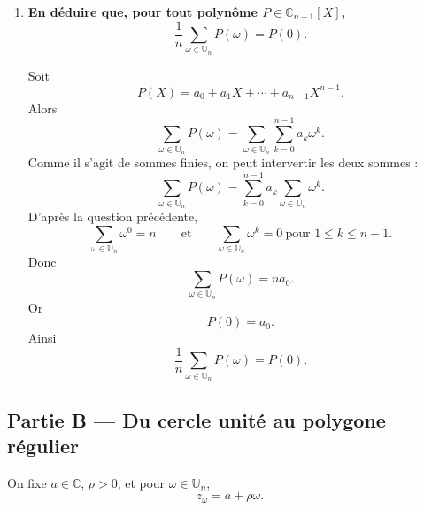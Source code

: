 \documentclass[11pt,a4paper]{article}
\newcommand{\C}{\mathbb{C}}
\newcommand{\U}{\mathbb{U}}
\newcommand{\ii}{\mathrm{i}}
\newcommand{\e}{\mathrm{e}}
\begin{document}
\begin{enumerate}[label=\textbf{A.\arabic*.}]
    Or
    \[
    q_m=1
    \Longleftrightarrow
    \e^{2m\ii\pi/n}=1
    \Longleftrightarrow
    n\mid m.
    \]

    Ainsi
    \[
    \boxed{
    S_m=
    \begin{cases}
    n & \text{si } n\mid m,\\
    0 & \text{sinon.}
    \end{cases}}
    \]

    \item \textbf{En déduire que, pour tout polynôme \(P\in\C_{n-1}[X]\),
    \[
    \frac1n\sum_{\omega\in\U_n}P(\omega)=P(0).
    \]}

    Soit
    \[
    P(X)=a_0+a_1X+\cdots+a_{n-1}X^{n-1}.
    \]
    Alors
    \[
    \sum_{\omega\in\U_n}P(\omega)
    =\sum_{\omega\in\U_n}\sum_{k=0}^{n-1}a_k\omega^k.
    \]
    Comme il s’agit de sommes finies, on peut intervertir les deux sommes :
    \[
    \sum_{\omega\in\U_n}P(\omega)
    =\sum_{k=0}^{n-1}a_k\sum_{\omega\in\U_n}\omega^k.
    \]
    D’après la question précédente,
    \[
    \sum_{\omega\in\U_n}\omega^0=n
    \qquad\text{et}\qquad
    \sum_{\omega\in\U_n}\omega^k=0\ \text{pour }1\le k\le n-1.
    \]
    Donc
    \[
    \sum_{\omega\in\U_n}P(\omega)=na_0.
    \]
    Or
    \[
    P(0)=a_0.
    \]
    Ainsi
    \[
    \boxed{\frac1n\sum_{\omega\in\U_n}P(\omega)=P(0).}
    \]
\end{enumerate}

\subsection*{Partie B --- Du cercle unité au polygone régulier}

On fixe \(a\in\C\), \(\rho>0\), et pour \(\omega\in\U_n\),
\[
z_\omega=a+\rho\omega.
\]
\end{document}
